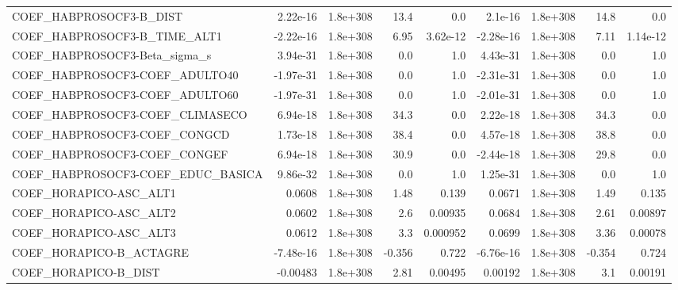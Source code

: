 \begin{tabular}{lrrrrrrrr}
COEF\_HABPROSOCF3-B\_DIST           &    2.22e-16 &     1.8e+308 &      13.4 &      0.0 &    2.1e-16 &    1.8e+308 &         14.8 &           0.0 \\
COEF\_HABPROSOCF3-B\_TIME\_ALT1      &   -2.22e-16 &     1.8e+308 &      6.95 & 3.62e-12 &  -2.28e-16 &    1.8e+308 &         7.11 &      1.14e-12 \\
COEF\_HABPROSOCF3-Beta\_sigma\_s     &    3.94e-31 &     1.8e+308 &       0.0 &      1.0 &   4.43e-31 &    1.8e+308 &          0.0 &           1.0 \\
COEF\_HABPROSOCF3-COEF\_ADULTO40    &   -1.97e-31 &     1.8e+308 &       0.0 &      1.0 &  -2.31e-31 &    1.8e+308 &          0.0 &           1.0 \\
COEF\_HABPROSOCF3-COEF\_ADULTO60    &   -1.97e-31 &     1.8e+308 &       0.0 &      1.0 &  -2.01e-31 &    1.8e+308 &          0.0 &           1.0 \\
COEF\_HABPROSOCF3-COEF\_CLIMASECO   &    6.94e-18 &     1.8e+308 &      34.3 &      0.0 &   2.22e-18 &    1.8e+308 &         34.3 &           0.0 \\
COEF\_HABPROSOCF3-COEF\_CONGCD      &    1.73e-18 &     1.8e+308 &      38.4 &      0.0 &   4.57e-18 &    1.8e+308 &         38.8 &           0.0 \\
COEF\_HABPROSOCF3-COEF\_CONGEF      &    6.94e-18 &     1.8e+308 &      30.9 &      0.0 &  -2.44e-18 &    1.8e+308 &         29.8 &           0.0 \\
COEF\_HABPROSOCF3-COEF\_EDUC\_BASICA &    9.86e-32 &     1.8e+308 &       0.0 &      1.0 &   1.25e-31 &    1.8e+308 &          0.0 &           1.0 \\
COEF\_HORAPICO-ASC\_ALT1            &      0.0608 &     1.8e+308 &      1.48 &    0.139 &     0.0671 &    1.8e+308 &         1.49 &         0.135 \\
COEF\_HORAPICO-ASC\_ALT2            &      0.0602 &     1.8e+308 &       2.6 &  0.00935 &     0.0684 &    1.8e+308 &         2.61 &       0.00897 \\
COEF\_HORAPICO-ASC\_ALT3            &      0.0612 &     1.8e+308 &       3.3 & 0.000952 &     0.0699 &    1.8e+308 &         3.36 &       0.00078 \\
COEF\_HORAPICO-B\_ACTAGRE           &   -7.48e-16 &     1.8e+308 &    -0.356 &    0.722 &  -6.76e-16 &    1.8e+308 &       -0.354 &         0.724 \\
COEF\_HORAPICO-B\_DIST              &    -0.00483 &     1.8e+308 &      2.81 &  0.00495 &    0.00192 &    1.8e+308 &          3.1 &       0.00191 \\

\end{tabular}
